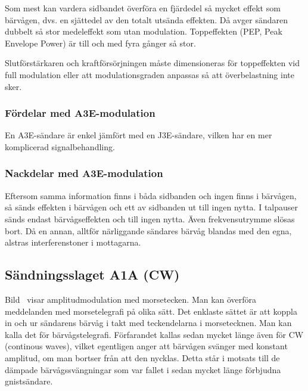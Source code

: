 Som mest kan vardera sidbandet överföra en fjärdedel så mycket effekt som
bärvågen, dvs. en sjättedel av den totalt utsända effekten.
Då avger sändaren dubbelt så stor medeleffekt som utan modulation.
Toppeffekten (PEP, Peak Envelope Power) är till och med fyra gånger så stor.

Slutförstärkaren och kraftförsörjningen måste dimensioneras för toppeffekten vid
full modulation eller att modulationsgraden anpassas så att överbelastning inte
sker.

\subsubsection{Fördelar med A3E-modulation}

En A3E-sändare är enkel jämfört med en J3E-sändare, vilken har en mer
komplicerad signalbehandling.


\subsubsection{Nackdelar med A3E-modulation}

Eftersom samma information finns i båda sidbanden och ingen finns i bärvågen,
så sänds effekten i bärvågen och ett av sidbanden ut till ingen nytta.
I talpauser sänds endast bärvågseffekten och till ingen nytta.
Även frekvensutrymme slösas bort.
Då en annan, alltför närliggande sändares bärvåg blandas med den egna,
alstras interferenstoner i mottagarna.


\subsection{Sändningsslaget A1A (CW)}
\label{modulation_cw}


Bild~ visar amplitudmodulation med morsetecken.
Man kan överföra meddelanden med morsetelegrafi på olika sätt.
Det enklaste sättet är att koppla in och ur sändarens bärvåg i takt med
teckendelarna i morsetecknen.
Man kan kalla det för bärvågstelegrafi.
Förfarandet kallas sedan mycket länge även för CW (continous waves), vilket
egentligen anger att bärvågen svänger med konstant amplitud, om man bortser
från att den nycklas.
Detta står i motsats till de dämpade bärvågssvängningar som var fallet i sedan
mycket länge förbjudna gnistsändare.

